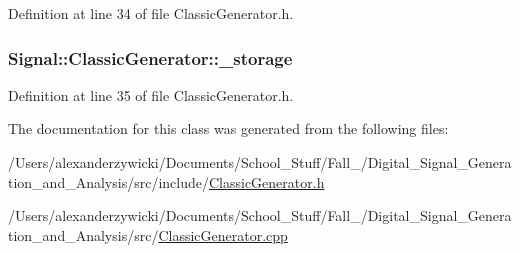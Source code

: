 Definition at line 34 of file Classic\+Generator.\+h.

\hypertarget{class_signal_1_1_classic_generator_a1214faf589eccb01631700723900bbf9}{
\subsubsection[{\+\_\+storage}]{ Signal\+::\+Classic\+Generator\+::\+\_\+storage\hspace{0.3cm}{\ttfamily [protected]}}}\label{class_signal_1_1_classic_generator_a1214faf589eccb01631700723900bbf9}


Definition at line 35 of file Classic\+Generator.\+h.



The documentation for this class was generated from the following files\+:\begin{DoxyCompactItemize}
\item 
/\+Users/alexanderzywicki/\+Documents/\+School\+\_\+\+Stuff/\+Fall\+\_/\+Digital\+\_\+\+Signal\+\_\+\+Generation\+\_\+and\+\_\+\+Analysis/src/include/\hyperlink{_classic_generator_8h}{Classic\+Generator.\+h}\item 
/\+Users/alexanderzywicki/\+Documents/\+School\+\_\+\+Stuff/\+Fall\+\_/\+Digital\+\_\+\+Signal\+\_\+\+Generation\+\_\+and\+\_\+\+Analysis/src/\hyperlink{_classic_generator_8cpp}{Classic\+Generator.\+cpp}\end{DoxyCompactItemize}
